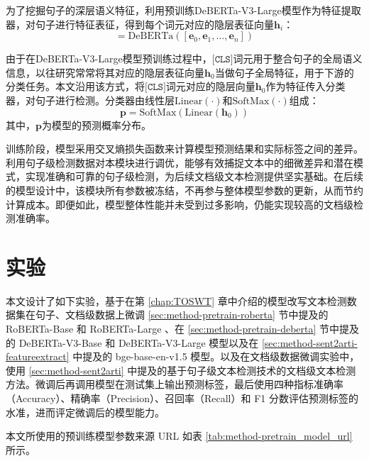 为了挖掘句子的深层语义特征，利用预训练DeBERTa-V3-Large模型作为特征提取器，对句子进行特征表征，得到每个词元对应的隐层表征向量$\mathbf{h}_{i}$：
\begin{equation}
    [\mathbf{h}_{0}, \mathbf{h}_{1}, \ldots, \mathbf{h}_{n}]=\mathrm{DeBERTa}([\mathbf{e}_{0}, \mathbf{e}_{1}, \ldots, \mathbf{e}_{n}])
\end{equation}

由于在DeBERTa-V3-Large模型预训练过程中，$\texttt{[CLS]}$词元用于整合句子的全局语义信息，以往研究常常将其对应的隐层表征向量$\mathbf{h}_{0}$当做句子全局特征，用于下游的分类任务。本文沿用该方式，将$\texttt{[CLS]}$词元对应的隐层向量$\mathbf{h}_{0}$作为特征传入分类器，对句子进行检测。分类器由线性层$\mathrm{Linear}(\cdot)$和$\mathrm{SoftMax}(\cdot)$组成：
\begin{equation}
    \mathbf{p}=\mathrm{SoftMax}(\mathrm{Linear}(\mathbf{h}_{0}))
\end{equation}
其中，$\mathbf{p}$为模型的预测概率分布。

训练阶段，模型采用交叉熵损失函数来计算模型预测结果和实际标签之间的差异。利用句子级检测数据对本模块进行调优，能够有效捕捉文本中的细微差异和潜在模式，实现准确和可靠的句子级检测，为后续文档级文本检测提供坚实基础。在后续的模型设计中，该模块所有参数被冻结，不再参与整体模型参数的更新，从而节约计算成本。即便如此，模型整体性能并未受到过多影响，仍能实现较高的文档级检测准确率。

\section{实验}
\label{sec:method-experiment}

本文设计了如下实验，基于在第 \ref{chap:TOSWT} 章中介绍的模型改写文本检测数据集在句子、文档级数据上微调 \ref{sec:method-pretrain-roberta} 节中提及的 RoBERTa-Base 和 RoBERTa-Large 、在 \ref{sec:method-pretrain-deberta} 节中提及的 DeBERTa-V3-Base 和 DeBERTa-V3-Large 模型以及在 \ref{sec:method-sent2arti-featureextract} 中提及的 bge-base-en-v1.5 模型。以及在文档级数据微调实验中，使用 \ref{sec:method-sent2arti} 中提及的基于句子级文本检测技术的文档级文本检测方法。微调后再调用模型在测试集上输出预测标签，最后使用四种指标准确率（Accuracy）、精确率（Precision）、召回率（Recall）和 F1 分数评估预测标签的水准，进而评定微调后的模型能力。

本文所使用的预训练模型参数来源 URL 如表 \ref{tab:method-pretrain_model_url} 所示。

